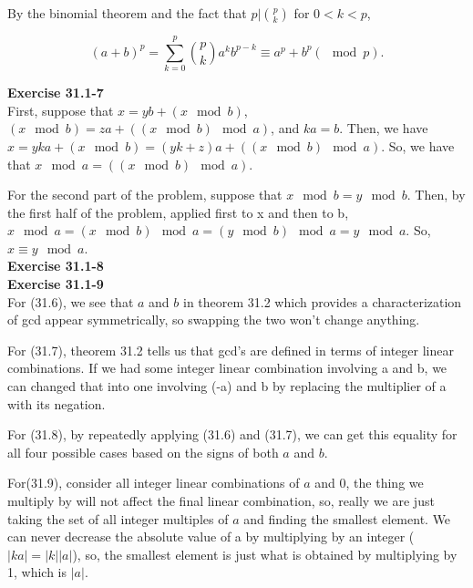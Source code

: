 \documentclass{article}
\begin{document}
By the binomial theorem and the fact that $p | {p \choose k}$ for $0 < k < p$, 

\[ (a+b)^p = \sum_{k=0}^p {p \choose k} a^k b^{p-k} \equiv a^p + b^p (\!\!\!\!\!\!\mod p).\]

\noindent\textbf{Exercise 31.1-7}\\

First, suppose that $x = yb + (x\mod b)$, $(x\mod b) = za + ((x\mod b)\mod a)$, and $ka =b$. Then, we have $x = yka +(x\mod b) = (yk+ z) a + ((x\mod b)\mod a)$. So, we have that $x\mod a =  ((x\mod b)\mod a)$.

For the second part of the problem, suppose that $ x\mod b = y\mod b$. Then, by the first half of the problem, applied first to x and then to b, $x \mod a = (x\mod b) \mod a = (y\mod b)\mod a = y\mod a$. So, $x \equiv y \mod a$.\\

\noindent\textbf{Exercise 31.1-8}\\


\noindent\textbf{Exercise 31.1-9}\\

For (31.6), we see that $a$ and $b$ in theorem 31.2 which provides a characterization of gcd appear symmetrically, so swapping the two won't change anything.

For (31.7), theorem 31.2 tells us that gcd's are defined in terms of integer linear combinations. If we had some integer linear combination involving a and b, we can changed that into one involving (-a) and b by replacing the multiplier of a with its negation.

For (31.8), by repeatedly applying (31.6) and (31.7), we can get this equality for all four possible cases based on the signs of both $a$ and $b$.

For(31.9), consider all integer linear combinations of $a$ and $0$, the thing we multiply  by will not affect the final linear combination, so, really we are just taking the set of all integer multiples of $a$ and finding the smallest element. We can never decrease the absolute value of a by multiplying by an integer ($|ka| = |k||a|$), so, the smallest element is just what is obtained by multiplying by 1, which is $|a|$.
\end{document}
